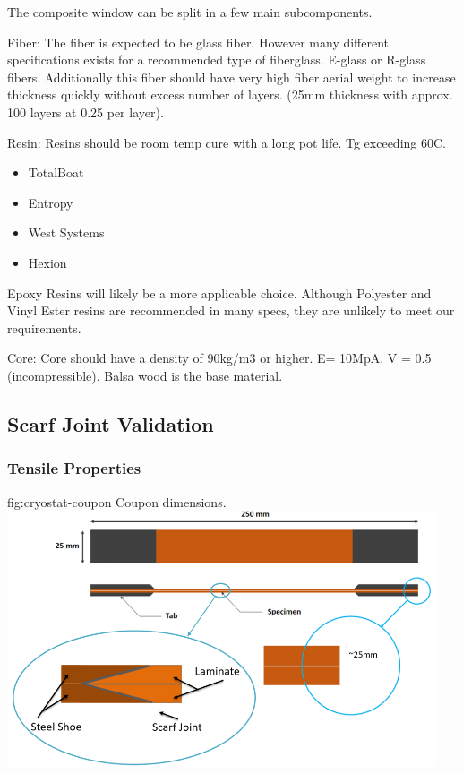The composite window can be split in a few main subcomponents.

Fiber: The fiber is expected to be glass fiber. However many different specifications exists for a
recommended type of fiberglass. E-glass or R-glass fibers. Additionally this fiber should have very
high fiber aerial weight to increase thickness quickly without excess number of layers. (25mm
thickness with approx. 100 layers at 0.25 per layer).

Resin: Resins should be room temp cure with a long pot life. Tg exceeding 60C.

\begin{itemize}
    \item TotalBoat
    \item Entropy
    \item West Systems
    \item Hexion
\end{itemize}

Epoxy Resins will likely be a more applicable choice. Although Polyester and Vinyl Ester resins are
recommended in many specs, they are unlikely to meet our requirements.

Core: Core should have a density of 90kg/m3 or higher. E= 10MpA. V = 0.5 (incompressible). Balsa
wood is the base material.

\subsection{Scarf Joint Validation}
\label{sec:cryost-proto-scarfval}

\subsubsection{Tensile Properties}
\label{sec:cryost-proto-scarften}

\begin{dunefigure}{fig:cryostat-coupon}
{Coupon dimensions.}
\includegraphics[width=0.95\textwidth]{graphics/cryostat/cryostat-coupon.PNG}
\end{dunefigure}

